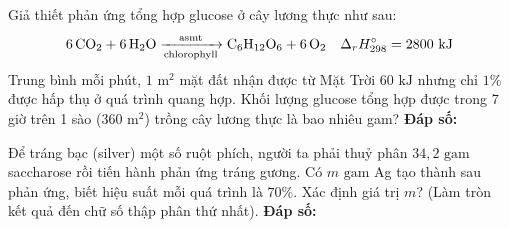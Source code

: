 \documentclass[12pt,a4paper]{article}
\begin{document}
\begin{ex}
Giả thiết phản ứng tổng hợp glucose ở cây lương thực như sau:
\[
\ce{6CO2 + 6H2O} \xrightarrow[\text{chlorophyll}]{\text{asmt}} \ce{C6H12O6 + 6O2} \quad \Delta_r H^\circ_{298} = 2800\text{ kJ}
\]
Trung bình mỗi phút, $1\text{ m}^2$ mặt đất nhận được từ Mặt Trời $60\text{ kJ}$ nhưng chỉ $1\%$ được hấp thụ ở quá trình quang hợp. Khối lượng glucose tổng hợp được trong 7 giờ trên 1 sào ($360\text{ m}^2$) trồng cây lương thực là bao nhiêu gam?
\noindent\textbf{Đáp số: \color{hfRed}{5832}}
\end{ex}

\begin{ex}
Để tráng bạc (silver) một số ruột phích, người ta phải thuỷ phân $34{,}2\text{ gam}$ saccharose rồi tiến hành phản ứng tráng gương. Có $m\text{ gam}$ Ag tạo thành sau phản ứng, biết hiệu suất mỗi quá trình là $70\%$. Xác định giá trị $m$? (Làm tròn kết quả đến chữ số thập phân thứ nhất).
\noindent\textbf{Đáp số: \color{hfRed}{21,2}}
\end{ex}
\end{document}
